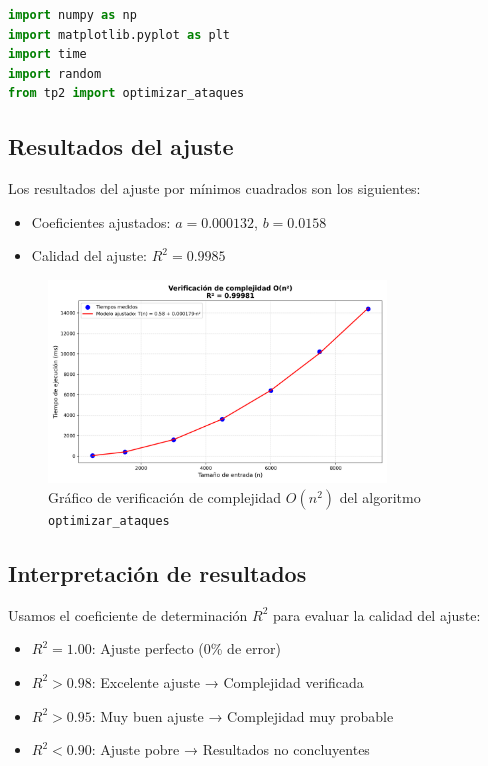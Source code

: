 \begin{lstlisting}[language=Python, caption=Código de ajuste por mínimos cuadrados para TP2]
import numpy as np
import matplotlib.pyplot as plt
import time
import random
from tp2 import optimizar_ataques

\end{lstlisting}

\subsection{Resultados del ajuste}

Los resultados del ajuste por mínimos cuadrados son los siguientes:

\begin{itemize}
    \item Coeficientes ajustados: $a = 0.000132$, $b = 0.0158$ 
    \item Calidad del ajuste: $R^2 = 0.9985$
\end{itemize}

\begin{figure}[H]
    \centering
    \includegraphics[width=0.8\textwidth]{./img/verificacion_complejidad_n2.png}
    \caption{Gráfico de verificación de complejidad $O(n^2)$ del algoritmo \texttt{optimizar\_ataques}}
\end{figure}

\subsection{Interpretación de resultados}

Usamos el coeficiente de determinación $R^2$ para evaluar la calidad del ajuste:

\begin{itemize}
    \item $R^2 = 1.00$: Ajuste perfecto (0\% de error)
    \item $R^2 > 0.98$: Excelente ajuste → Complejidad verificada
    \item $R^2 > 0.95$: Muy buen ajuste → Complejidad muy probable
    \item $R^2 < 0.90$: Ajuste pobre → Resultados no concluyentes
\end{itemize}
